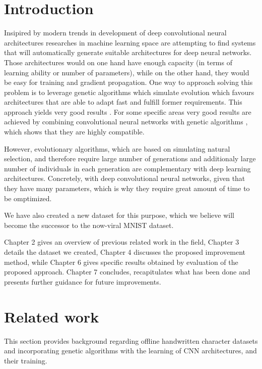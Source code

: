 \documentclass[eng]{simposium}
\begin{document}
\section{Introduction}

Insipired by modern trends in development of deep convolutional neural architectures \cite{28}\cite{29} researches in machine 
learning space are attempting to find systems that will automatically generate suitable architectures for deep neural networks.
Those architectures would on one hand have enough capacity (in terms of learning ability or number of parameters), while on 
the other hand, they would be easy for training and gradient propagation.
One way to approach solving this problem is to leverage genetic algorithms which simulate evolution which favours architectures 
that are able to adapt fast and fulfill former requirements.
This approach yields very good results \cite{5}\cite{30}\cite{31}. 
For some specific areas very good results are achieved by combining convolutional neural networks with genetic algorithms \cite{32}\cite{33},
which shows that they are highly compatible. 

However, evolutionary algorithms, which are based on simulating natural selection, and therefore require large number 
of generations and additionaly large number of individuals in each generation are complementary with deep learning architectures.
Concretely, with deep convolutional neural networks, given that they have many parameters, which is why they require great 
amount of time to be omptimized.   

We have also created a new dataset for this purpose, which we believe will become the successor to the now-viral MNIST dataset.

Chapter 2 gives an overview of previous related work in the field, Chapter 3 details the dataset we created,
Chapter 4 discusses the proposed improvement method, while Chapter 6 gives specific results obtained by evaluation of the proposed approach.
Chapter 7 concludes, recapitulates what has been done and presents further guidance for future improvements.

\section{Related work}

This section provides background regarding offline handwritten character datasets and incorporating genetic algorithms 
with the learning of CNN architectures, and their training. 
\end{document}
